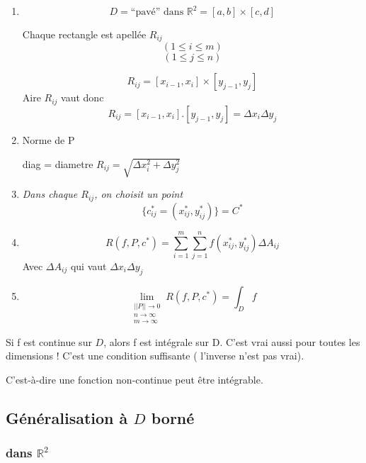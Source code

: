 \begin{enumerate}
\item

$$D= \text{``pavé'' dans }\mathbb{R}^2 = [a,b]\times[c,d]$$

Chaque rectangle est apellée $R_{ij}$
\[(1 \le i \le m)\]
\[(1 \le j \le n)\]

$$R_{ij}=[x_{i-1},x_i]\times[y_{j-1},y_j]$$
Aire $R_{ij}$ vaut donc
$$R_{ij}=[x_{i-1},x_i] . [y_{j-1},y_j]= \Delta x_i \Delta y_j$$

\item{Norme de P}


diag = diametre $R_{ij}= \sqrt{\Delta x_i^2+\Delta y_j^2}$


\item


\textit{Dans chaque $R_{ij}$, on choisit un point}
$$\{c_{ij}^* = (x_{ij}^*,y_{ij}^*)\} = C^*$$

\item
$$R(f, P,c^*)=\sum_{i=1}^{m} \sum_{j=1}^{n} f(x_{ij}^*,y_{ij}^*)\Delta A_{ij}$$
Avec $\Delta A_{ij}$ qui vaut $\Delta x_i \Delta y_j$


\item

$$\lim\limits_{\substack{||P|| \to 0 \\ n \to \infty\\ m \to \infty}} R(f,P,c^*)=\int_D f$$

\end{enumerate}



\begin{mytheo}

 Si f est continue sur $D$, alors f est intégrale sur D. C'est vrai aussi pour toutes les dimensions ! C'est une condition suffisante ( l'inverse n'est pas vrai).

C'est-à-dire une fonction non-continue peut être intégrable.

\end{mytheo}






\subsection{ Généralisation à $D$ borné }

\subsubsection{ dans $ \mathbb{R}^2$ }






